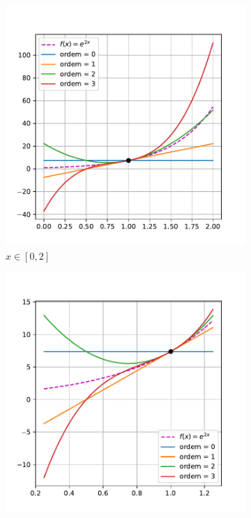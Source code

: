 \documentclass[10pt, a4paper]{article}
\begin{document}
\begin{figure}
    \centering
    \begin{subfigure}[b]{0.32\textwidth}
        \centering
        \includegraphics[width=\textwidth]{images/q3_1.pdf}
        \caption{$x \in [0, 2]$}
        \label{fig:q3_1}
    \end{subfigure}
    \hfill
    \begin{subfigure}[b]{0.32\textwidth}
        \centering
        \includegraphics[width=\textwidth]{images/q3_2.pdf}

\end{subfigure}
\end{figure}
\end{document}

